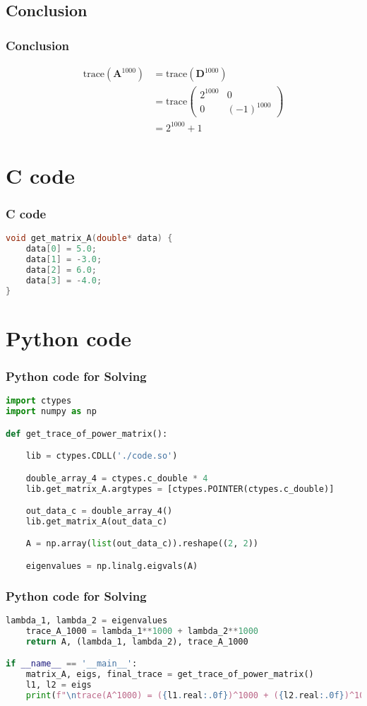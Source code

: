\documentclass{beamer}
\providecommand{\brak}[1]{\ensuremath{\left(#1\right)}}
\theoremstyle{remark}
\newcommand{\myvec}[1]{\ensuremath{\begin{pmatrix}#1\end{pmatrix}}}
\let\vec\mathbf
\numberwithin{equation}{section}
\begin{document}
\subsection{Conclusion}
\begin{frame}
\frametitle{Conclusion}
   \begin{align}
     \text{trace}\brak{\vec{A}^{1000}}&=\text{trace}\brak{\vec{D}^{1000}} \\
&=\text{trace}\myvec{2^{1000}&0\\0&\brak{-1}^{1000}} \\
&=2^{1000}+1
 \end{align}
 \end{frame}
 \section{C code}
  \begin{frame}[fragile]
\frametitle{C code }
\begin{lstlisting}[language=C]
void get_matrix_A(double* data) {
    data[0] = 5.0;
    data[1] = -3.0;
    data[2] = 6.0;
    data[3] = -4.0;
}

\end{lstlisting}
\end{frame}
\section{Python code}
 \begin{frame}[fragile]
\frametitle{Python code for Solving }
\begin{lstlisting}[language=Python]
import ctypes
import numpy as np

def get_trace_of_power_matrix():

    lib = ctypes.CDLL('./code.so')

    double_array_4 = ctypes.c_double * 4
    lib.get_matrix_A.argtypes = [ctypes.POINTER(ctypes.c_double)]

    out_data_c = double_array_4()
    lib.get_matrix_A(out_data_c)

    A = np.array(list(out_data_c)).reshape((2, 2))

    eigenvalues = np.linalg.eigvals(A)
\end{lstlisting}
\end{frame}

 \begin{frame}[fragile]
\frametitle{Python code for Solving }
\begin{lstlisting}[language=Python]
lambda_1, lambda_2 = eigenvalues
    trace_A_1000 = lambda_1**1000 + lambda_2**1000
    return A, (lambda_1, lambda_2), trace_A_1000

if __name__ == '__main__':
    matrix_A, eigs, final_trace = get_trace_of_power_matrix()
    l1, l2 = eigs
    print(f"\ntrace(A^1000) = ({l1.real:.0f})^1000 + ({l2.real:.0f})^1000")


\end{lstlisting}
\end{frame}
\end{document}
